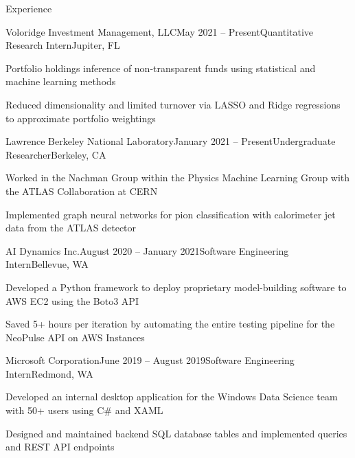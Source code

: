 \documentclass{resume} %
\begin{document}
\begin{rSection}{Experience}

\begin{rSubsection}{Voloridge Investment Management, LLC}{May 2021 – Present}{Quantitative Research Intern}{Jupiter, FL}
    \item Portfolio holdings inference of non-transparent funds using statistical and machine learning methods
    \item Reduced dimensionality and limited turnover via LASSO and Ridge regressions to approximate portfolio weightings 
\end{rSubsection}

\begin{rSubsection}{Lawrence Berkeley National Laboratory}{January 2021 – Present}{Undergraduate Researcher}{Berkeley, CA}
    \item Worked in the Nachman Group within the Physics Machine Learning Group with the ATLAS Collaboration at CERN
    \item Implemented graph neural networks for pion classification with calorimeter jet data from the ATLAS detector
\end{rSubsection}

\begin{rSubsection}{AI Dynamics Inc.}{August 2020 – January 2021}{Software Engineering Intern}{Bellevue, WA}
    \item Developed a Python framework to deploy proprietary model-building software to AWS EC2 using the Boto3 API
    \item Saved 5+ hours per iteration by automating the entire testing pipeline for the NeoPulse API on AWS Instances
\end{rSubsection}

\begin{rSubsection}{Microsoft Corporation}{June 2019 – August 2019}{Software Engineering Intern}{Redmond, WA}
    \item Developed an internal desktop application for the Windows Data Science team with 50+ users using C\# and XAML
    \item Designed and maintained backend SQL database tables and implemented queries and REST API endpoints
\end{rSubsection}

\end{rSection}
\end{document}

